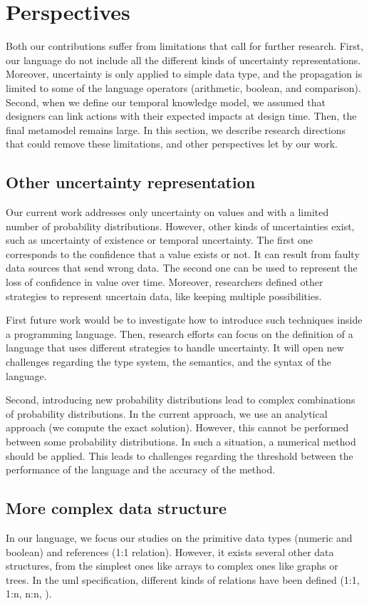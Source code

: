 \section{Perspectives}
Both our contributions suffer from limitations that call for further research.
First, our language \langName{} do not include all the different kinds of uncertainty representations.
Moreover, uncertainty is only applied to simple data type, and the propagation is limited to some of the language operators (arithmetic, boolean, and comparison).
Second, when we define our temporal knowledge model, we assumed that designers can link actions with their expected impacts at design time.
Then, the final \gls{metamodel} remains large.
In this section, we describe research directions that could remove these limitations, and other perspectives let by our work.


\subsection{Other uncertainty representation}
Our current work addresses only uncertainty on values and with a limited number of probability distributions.
However, other kinds of uncertainties exist, such as uncertainty of existence or temporal uncertainty.
The first one corresponds to the confidence that a value exists or not.
It can result from faulty data sources that send wrong data.
The second one can be used to represent the loss of confidence in value over time.
Moreover, researchers defined other strategies to represent uncertain data, like keeping multiple possibilities.

First future work would be to investigate how to introduce such techniques inside a programming language.
Then, research efforts can focus on the definition of a language that uses different strategies to handle uncertainty.
It will open new challenges regarding the type system, the semantics, and the syntax of the language.

Second, introducing new probability distributions lead to complex combinations of probability distributions.
In the current approach, we use an analytical approach (we compute the exact solution).
However, this cannot be performed between some probability distributions.
In such a situation, a numerical method should be applied.
This leads to challenges regarding the threshold between the performance of the language and the accuracy of the method.

\subsection{More complex data structure}
In our language, we focus our studies on the primitive data types (numeric and boolean) and references (1:1 relation).
However, it exists several other data structures, from the simplest ones like arrays to complex ones like graphs or trees.
In the \gls{uml} specification, different kinds of relations have been defined (1:1, 1:n, n:n, \etc).

